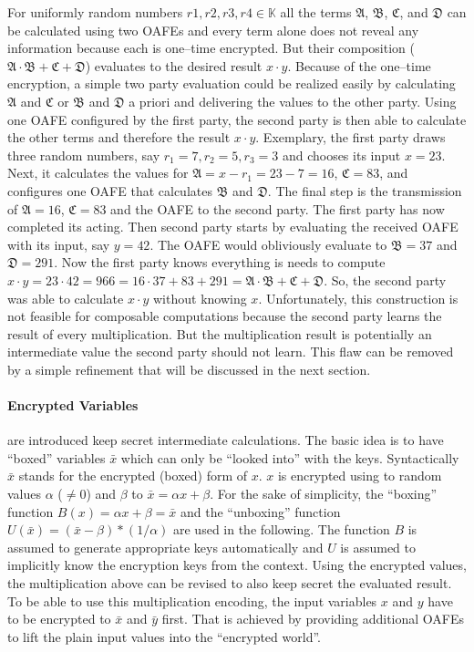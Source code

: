 \noindent{}For uniformly random numbers $r1, r2, r3, r4 \in \mathbb{K}$ all the
terms $\mathfrak{A}$, $\mathfrak{B}$, $\mathfrak{C}$, and $\mathfrak{D}$ can be
calculated using two OAFEs and every term alone does not reveal any information
because each is one--time encrypted. But their composition ($\mathfrak{A} \cdot
\mathfrak{B} + \mathfrak{C} + \mathfrak{D}$) evaluates to the desired result $x
\cdot y$. Because of the one--time encryption, a simple two party evaluation
could be realized easily by calculating $\mathfrak{A}$ and $\mathfrak{C}$ or
$\mathfrak{B}$ and $\mathfrak{D}$ a priori and delivering the values to the
other party. Using one OAFE configured by the first party, the second party is
then able to calculate the other terms and therefore the result $x \cdot y$.
Exemplary, the first party draws three random numbers, say $r_1=7, r_2=5, r_3=3$
and chooses its input $x=23$. Next, it calculates the values for $\mathfrak{A} =
x - r_1 = 23 - 7 = 16$, $\mathfrak{C} = 83$, and configures one OAFE that
calculates $\mathfrak{B}$ and $\mathfrak{D}$. The final step is the transmission
of $\mathfrak{A} = 16$, $\mathfrak{C} = 83$ and the OAFE to the second party.
The first party has now completed its acting. Then second party starts by
evaluating the received OAFE with its input, say $y = 42$. The OAFE would
obliviously evaluate to $\mathfrak{B} = 37$ and $\mathfrak{D} = 291$. Now the
first party knows everything is needs to compute $x \cdot y = 23 \cdot 42 = 966
= 16 \cdot 37 + 83 + 291 = \mathfrak{A} \cdot \mathfrak{B} + \mathfrak{C} +
\mathfrak{D}$. So, the second party was able to calculate $x \cdot y$ without
knowing $x$.  Unfortunately, this construction is not feasible for composable
computations because the second party learns the result of every multiplication.
But the multiplication result is potentially an intermediate value the second
party should not learn. This flaw can be removed by a simple refinement that
will be discussed in the next section.


\paragraph{Encrypted Variables} are introduced keep secret intermediate
calculations. The basic idea is to have ``boxed'' variables $\bar{x}$ which can
only be ``looked into'' with the keys. Syntactically $\bar{x}$ stands for the
encrypted (boxed) form of $x$. $x$ is encrypted using to random values $\alpha$
($\neq 0$) and $\beta$ to $\bar{x} = \alpha x + \beta$.  For the sake of
simplicity, the ``boxing'' function $B(x) = \alpha x + \beta = \bar{x}$ and the
``unboxing'' function $U(\bar{x}) = (\bar{x}-\beta)*(1/\alpha)$ are used in the
following. The function $B$ is assumed to generate appropriate keys
automatically and $U$ is assumed to implicitly know the encryption keys from the
context. Using the encrypted values, the multiplication above can be revised to
also keep secret the evaluated result. To be able to use this multiplication
encoding, the input variables $x$ and $y$ have to be encrypted to $\bar{x}$ and
$\bar{y}$ first. That is achieved by providing additional OAFEs to lift the
plain input values into the ``encrypted world''.

